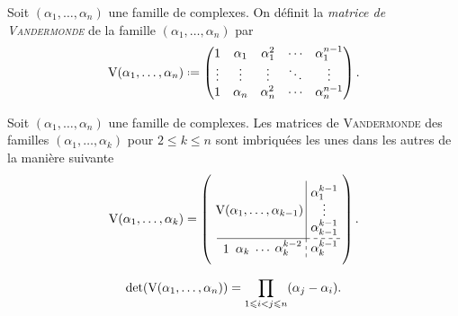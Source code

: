 \begin{defi}
    Soit $(\alpha_1, \dots, \alpha_n)$ une famille de complexes. On définit la \emph{matrice de \textsc{Vandermonde}} de la famille $(\alpha_1, \dots, \alpha_n)$ par
    $$\Vandermonde(\alpha_1, \dots, \alpha_n) \defeq \begin{pmatrix}
    1 & \alpha_1 & \alpha_1^2 & \cdots & \alpha_1^{n-1} \\
    \vdots & \vdots & \vdots & \ddots & \vdots \\
    1 & \alpha_n & \alpha_n^2 & \cdots & \alpha_n^{n-1}
    \end{pmatrix}.$$
\end{defi}

\newcommand{\vandk}{
\left(\begin{gathered}
    \tikzpicture[every node/.style={anchor=south west}]
        \node[minimum width=2cm,minimum height=1.5cm] at (-0.16,0.625) {$\Vandermonde(\alpha_1, \dots, \alpha_{k-1})$};
        \node[minimum width=0.5cm,minimum height=0.5cm] at (0,0.05) {$1$};
        \node[minimum width=0.5cm,minimum height=0.5cm] at (0.4, 0) {$\alpha_{k}$};
        \node[minimum width=0.5cm,minimum height=0.5cm] at (0.95,0) {$\cdots$};
        \node[minimum width=0.5cm,minimum height=0.5cm] at (1.5,0) {$\alpha_{k}^{k-2}$};
        \node[minimum width=1cm,minimum height=0.5cm] at (2.5,0) {$\alpha_{k}^{k-1}$};
        \node[minimum width=1cm,minimum height=1cm] at (2.5,0.4) {$\alpha_{k-1}^{k-1}$};
        \node[minimum width=1cm,minimum height=1cm] at (2.5,1) {$\vdots$};
        \node[minimum width=1cm,minimum height=1cm] at (2.5,1.4) {$\alpha_1^{k-1}$};
        \draw (0,0.6) -- (2.5,0.6);
        \draw (2.5,0.6) -- (2.5,2.225);
        \draw[dashed] (2.5,0.6) -- (3.5,0.6);
        \draw[dashed] (2.5,0.6) -- (2.5,0);
    \endtikzpicture
    \end{gathered}\right)
}

\begin{remarque}
    Soit $(\alpha_1, \dots, \alpha_n)$ une famille de complexes. Les matrices de \textsc{Vandermonde} des familles $(\alpha_1, \dots, \alpha_k)$ pour $2 \leqslant k \leqslant n$ sont imbriquées les unes dans les autres de la manière suivante
    $$\Vandermonde(\alpha_1, \dots, \alpha_k) = \vandk.$$
\end{remarque}

\begin{prop}
    $$\det (\mathrm{V}(\alpha_1, \dots, \alpha_n)) = \prod_{1\leqslant i < j \leqslant n}(\alpha_j - \alpha_i).$$
\end{prop}

